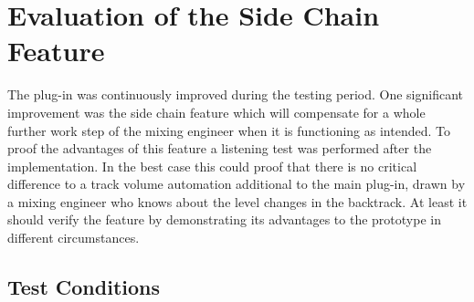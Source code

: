 \chapter{Evaluation of the Side Chain Feature}
\label{chapter:evaluation}

The plug-in was continuously improved during the testing period. One significant improvement was the side chain feature which will compensate for a whole further work step of the mixing engineer when it is functioning as intended. To proof the advantages of this feature a listening test was performed after the implementation. In the best case this could proof that there is no critical difference to a track volume automation additional to the main plug-in, drawn by a mixing engineer who knows about the level changes in the backtrack. At least it should verify the feature by demonstrating its advantages to the prototype in different circumstances.\\

\section{Test Conditions}

